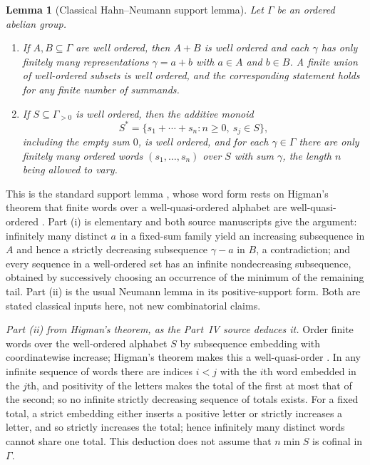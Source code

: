 \documentclass[11pt,a4paper]{article}
\numberwithin{equation}{section}
\newtheorem{lemma}[lemma]{Lemma}
\theoremstyle{definition}
\theoremstyle{remark}
\begin{document}
\begin{lemma}[Classical Hahn--Neumann support lemma]\label{ihs:lem:support}
Let $\Gamma$ be an ordered abelian group.
\begin{enumerate}[label=\textup{(\roman*)}]
\item If $A,B\subseteq\Gamma$ are well ordered, then $A+B$ is well ordered
and each $\gamma$ has only finitely many representations $\gamma=a+b$ with
$a\in A$ and $b\in B$. A finite union of well-ordered subsets is well
ordered, and the corresponding statement holds for any finite number of
summands.
\item If $S\subseteq\Gamma_{>0}$ is well ordered, then the additive monoid
\[
 S^*=\{s_1+\cdots+s_n:n\ge0,\ s_j\in S\},
\]
including the empty sum $0$, is well ordered, and for each $\gamma\in\Gamma$
there are only finitely many \emph{ordered words} $(s_1,\ldots,s_n)$ over
$S$ with sum $\gamma$, the length $n$ being allowed to vary.
\end{enumerate}
\end{lemma}

This is the standard support lemma \cite{Neumann}, whose word form rests on
Higman's theorem that finite words over a well-quasi-ordered alphabet are
well-quasi-ordered \cite{Higman}. Part (i) is elementary and both source
manuscripts give the argument: infinitely many distinct $a$ in a fixed-sum
family yield an increasing subsequence in $A$ and hence a strictly
decreasing subsequence $\gamma-a$ in $B$, a contradiction; and every
sequence in a well-ordered set has an infinite nondecreasing subsequence,
obtained by successively choosing an occurrence of the minimum of the
remaining tail. Part (ii) is the usual Neumann lemma in its positive-support
form. Both are stated classical inputs here, not new combinatorial claims.

\emph{Part (ii) from Higman's theorem, as the Part~IV source deduces it.}
Order finite words over the well-ordered alphabet $S$ by subsequence
embedding with coordinatewise increase; Higman's theorem makes this a
well-quasi-order \cite{Higman}. In any infinite sequence of words there are
indices $i<j$ with the $i$th word embedded in the $j$th, and positivity of
the letters makes the total of the first at most that of the second; so no
infinite strictly decreasing sequence of totals exists. For a fixed total, a
strict embedding either inserts a positive letter or strictly increases a
letter, and so strictly increases the total; hence infinitely many distinct
words cannot share one total. This deduction does not assume that $n\min S$
is cofinal in $\Gamma$.
\end{document}
